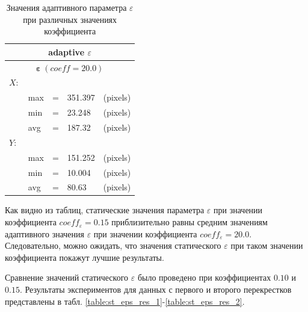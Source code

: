 \begin{table}[!htb]
	\caption{Значения адаптивного параметра $\varepsilon$ при различных значениях коэффициента}
	\label{table:eps_adapt}
	
	\setlength{\tabcolsep}{10pt}
	\centering
	
	\begin{tabular}{||lllll||}
		\multicolumn{5}{c}{adaptive $\varepsilon$} \\
			\hline
		\multicolumn{5}{||c||}{$\bm{\varepsilon}\ (coeff = 20.0)$}\\
		$X:$       			& & & & \\[0.5ex]
		& max 	& = 	& 351.397 	& (pixels) \\[0.5ex]
		& min 	& = 	& 23.248 	& (pixels) \\[0.5ex]
		& avg 	& = 	& 187.32 	& (pixels) \\[0.5ex]
		$Y:$       			& & & & \\[0.5ex]
		& max 	& = 	& 151.252 	& (pixels) \\[0.5ex]
		& min 	& = 	& 10.004 	& (pixels) \\[0.5ex]
		& avg 	& = 	& 80.63 	& (pixels) \\[0.5ex]
		\hline
	\end{tabular}
\end{table}

Как видно из таблиц, статические значения параметра $\varepsilon$ при значении коэффициента $coeff_\varepsilon = 0.15$ приблизительно равны средним значениям адаптивного значения $\varepsilon$ при значении коэффициента $coeff_\varepsilon = 20.0$. Следовательно, можно ожидать, что значения статического $\varepsilon$ при таком значении коэффициента покажут лучшие результаты.

Сравнение значений статического $\varepsilon$ было проведено при коэффициентах $0.10$ и $0.15$. Результаты экспериментов для данных с первого и второго перекрестков представлены в табл. \ref{table:st_eps_res_1}-\ref{table:st_eps_res_2}.

